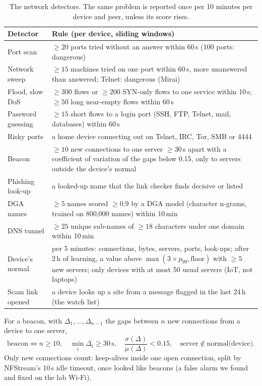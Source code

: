 \documentclass[11pt,a4paper]{article}
\begin{document}
\begin{table}[H]
\centering\small
\begin{tabularx}{\textwidth}{@{}>{\raggedright\arraybackslash}p{3.3cm}X@{}}
\toprule
\textbf{Detector} & \textbf{Rule (per device, sliding windows)}\\
\midrule
Port scan & $\ge 20$ ports tried without an answer within 60\,s (100 ports: dangerous)\\
Network sweep & $\ge 15$ machines tried on one port within 60\,s, more unanswered than answered; Telnet: dangerous (Mirai)\\
Flood, slow DoS & $\ge 300$ flows or $\ge 200$ SYN-only flows to one service within 10\,s; $\ge 50$ long near-empty flows within 60\,s\\
Password guessing & $\ge 15$ short flows to a login port (SSH, FTP, Telnet, mail, databases) within 60\,s\\
Risky ports & a home device connecting out on Telnet, IRC, Tor, SMB or 4444\\
Beacon & $\ge 10$ new connections to one server $\ge 30$\,s apart with a coefficient of variation of the gaps below 0.15, only to servers outside the device's normal\\
Phishing look-up & a looked-up name that the link checker finds decisive or listed\\
DGA names & $\ge 5$ names scored $\ge 0.9$ by a DGA model (character n-grams, trained on 800,000 names) within 10\,min\\
DNS tunnel & $\ge 25$ unique sub-names of $\ge 18$ characters under one domain within 10\,min\\
Device's normal & per 5 minutes: connections, bytes, servers, ports, look-ups; after 2\,h of learning, a value above $\max(3 \times p_{99}, \text{floor})$ with $\ge 5$ new servers; only devices with at most 50 usual servers (IoT, not laptops)\\
Scam link opened & a device looks up a site from a message flagged in the last 24\,h (the watch list)\\
\bottomrule
\end{tabularx}
\caption{The network detectors. The same problem is reported once per 10 minutes per device and peer, unless its score rises.}
\end{table}

For a beacon, with $\Delta_1,\dots,\Delta_{n-1}$ the gaps between $n$ new connections from a device to one server,
\begin{equation}
  \text{beacon} \iff n \ge 10,\quad \min_i \Delta_i \ge 30\,\text{s},\quad \frac{\sigma(\Delta)}{\mu(\Delta)} < 0.15,
  \quad \text{server} \notin \text{normal(device)}.
\end{equation}
Only new connections count: keep-alives inside one open connection, split by NFStream's 10\,s idle timeout, once
looked like beacons (a false alarm we found and fixed on the lab Wi-Fi).
\end{document}
